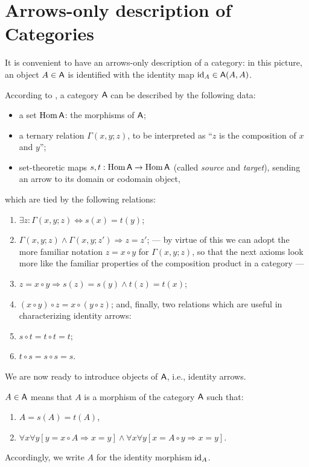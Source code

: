 

\chapter{Arrows-only description of Categories}
\label{cha:arrows}

It is convenient to have an arrows-only description of a category: in
this picture, an object $A \in \mathsf{A}$ is identified with the identity map
$\operatorname{id}_A \in \mathsf{A}(A, A)$.

According to \cite{lawvere;1965}, a category $\mathsf{A}$ can be described by
the following data:
\begin{itemize}
\item a set $\operatorname{Hom}\mathsf{A}$: the morphisms of $\mathsf{A}$;
\item a ternary relation $\Gamma(x,y;z)$, to be interpreted as ``$z$ is
  the composition of $x$ and $y$'';
\item set-theoretic maps $s,t: \operatorname{Hom}\mathsf{A} \to \operatorname{Hom}\mathsf{A}$ (called \emph{source}
  and \emph{target}), sending an arrow to its domain or codomain
  object,
\end{itemize}
which are tied by the following relations:
\begin{enumerate}
\item $\exists z: \Gamma(x,y;z) \Leftrightarrow s(x) = t(y)$; \label{item:A1}
\item $\Gamma(x,y;z) \land \Gamma(x,y;z') \Rightarrow z = z'$;
--- by virtue of this we can adopt the more familiar notation $z = x\circ
y$ for $\Gamma(x,y; z)$, so that the next axioms look more like the
familiar properties of the composition product in a category ---
\item $z = x\circ y \Rightarrow s(z) = s(y) \land t(z) = t(x)$;
\item $(x\circ y) \circ z = x \circ (y \circ z)$;
and, finally, two relations which are useful in characterizing
identity arrows:
\item $s \circ t = t \circ t = t$;
\item $t \circ s = s \circ s = s$.
\end{enumerate}

We are now ready to introduce objects of $\mathsf{A}$, i.e., identity
arrows. 
\begin{definition}\label{dfn:object}
  $A\in \mathsf{A}$ means that $A$ is a morphism of the category $\mathsf{A}$
  such that:
  \begin{enumerate}
  \item $A = s(A) = t(A)$, \label{item:AO1}
  \item $\forall x\forall y[ y = x \circ A \Rightarrow x = y] \land \forall x\forall y [
    x = A \circ y \Rightarrow x = y]$. \label{item:AO2} 
  \end{enumerate}
\end{definition}
Accordingly, we write $A$ for the identity morphism $\operatorname{id}_A$.


